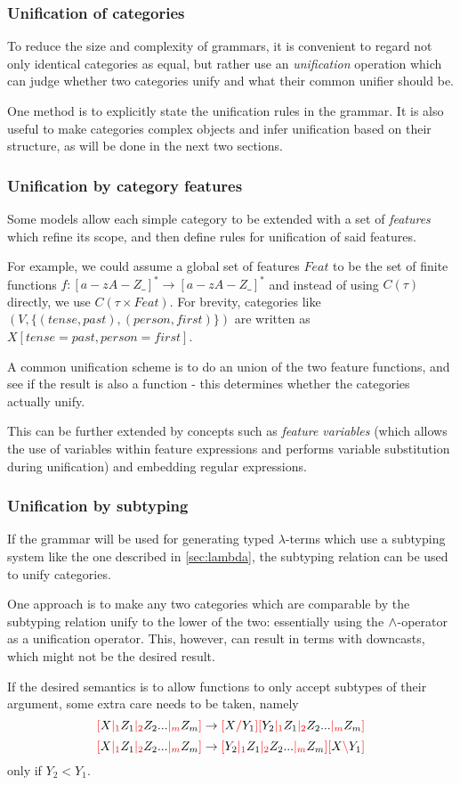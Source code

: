 \documentclass[main.tex]{subfiles}
\begin{document}
\subsubsection{Unification of categories}
To reduce the size and complexity of grammars, it is convenient to regard
not only identical categories as equal, but rather use an \emph{unification}
operation which can judge whether two categories unify and what their common
unifier should be.

One method is to explicitly state the unification rules in the grammar.
It is also useful to make categories complex objects and infer unification
based on their structure, as will be done in the next two sections.

\subsubsection{Unification by category features}
Some models allow each simple category to be extended with a set of \emph{features}
which refine its scope, and then define rules for unification of said features.

For example, we could assume a global set of features $Feat$ to be the
set of finite functions $f: [a-zA-Z\_]^* \rightarrow [a-zA-Z\_]^*$
and instead of using $C(\tau)$ directly, we use $C(\tau \times Feat)$.
For brevity, categories like $(V, \{ (tense, past), (person, first) \})$
are written as $X[tense=past, person=first]$.

A common unification scheme is to do an union of the two feature functions,
and see if the result is also a function - this determines whether the
categories actually unify.

This can be further extended by concepts such as \emph{feature variables}
(which allows the use of variables within feature expressions and
performs variable substitution during unification) and embedding regular expressions.

\subsubsection{Unification by subtyping}
If the grammar will be used for generating typed $\lambda$-terms which use
a subtyping system like the one described in \autoref{sec:lambda}, the subtyping
relation can be used to unify categories.

One approach is to make any two categories which are comparable by the subtyping
relation unify to the lower of the two: essentially using the $\wedge$-operator
as a unification operator. This, however, can result in terms with downcasts,
which might not be the desired result.

If the desired semantics is to allow functions to only accept subtypes of
their argument, some extra care needs to be taken, namely
\[ \textcolor{red}{[} X \textcolor{red}{|_{1}} Z_1 \textcolor{red}{|_{2}} Z_2 ... \textcolor{red}{|_{m}} Z_m \textcolor{red}{]} \rightarrow \textcolor{red}{[} X \textcolor{red}{/} Y_1 \textcolor{red}{]} \textcolor{red}{[} Y_2 \textcolor{red}{|_{1}} Z_1 \textcolor{red}{|_{2}} Z_2 ... \textcolor{red}{|_{m}} Z_m \textcolor{red}{]} \]
\[ \textcolor{red}{[} X \textcolor{red}{|_{1}} Z_1 \textcolor{red}{|_{2}} Z_2 ... \textcolor{red}{|_{m}} Z_m \textcolor{red}{]} \rightarrow \textcolor{red}{[} Y_2 \textcolor{red}{|_{1}} Z_1 \textcolor{red}{|_{2}} Z_2 ... \textcolor{red}{|_{m}} Z_m \textcolor{red}{]} \textcolor{red}{[} X \textcolor{red}{\backslash} Y_1 \textcolor{red}{]} \]
only if $Y_2 \less Y_1$.
\end{document}
